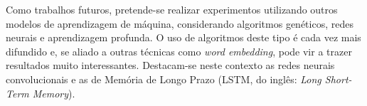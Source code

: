 \documentclass[oneside,openright,12pt]{ufsm_2015} %
\begin{document}

    \par Como trabalhos futuros, pretende-se realizar experimentos utilizando outros modelos de aprendizagem de máquina, considerando algoritmos genéticos, redes neurais e aprendizagem profunda. O uso de algoritmos deste tipo é cada vez mais difundido e, se aliado a outras técnicas como \textit{word embedding}, pode vir a trazer resultados muito interessantes. Destacam-se neste contexto as redes neurais convolucionais e as de Memória de Longo Prazo (LSTM, do inglês: \textit{Long Short-Term Memory}).




	
\apendice %

        
\anexo    %

\end{document}

